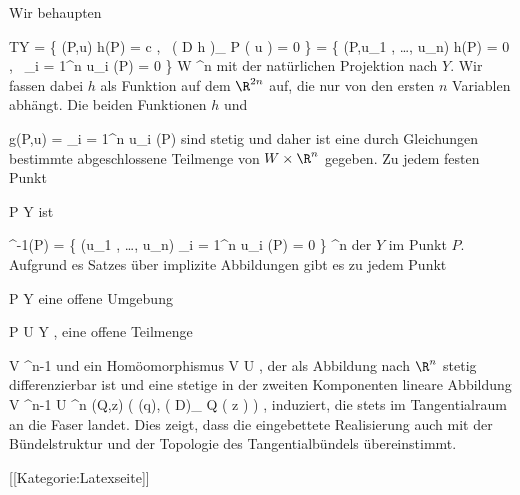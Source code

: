 Wir behaupten

\mavergleichskettealignhandlinks
{\vergleichskettealignhandlinks
{ TY
}
{ =} { \left\{  (P,u)   \mid   h(P) = c , \,  \left(  D h   \right)_{ P } \left(  u  \right) = 0       \right\}
}
{ =} { \left\{  (P,u_1 , \ldots , u_n)   \mid   h(P) = 0 , \,  \sum_{i = 1}^n u_i {  } (P) = 0       \right\}
}
{ \subseteq} { W \times \R^n
}
{ } {
}
}
{}
{}{}
mit der natürlichen Projektion nach $Y$. Wir fassen dabei $h$ als Funktion auf dem $\R^{2n}$ auf, die nur von den ersten $n$ Variablen abhängt. Die beiden Funktionen $h$  und

\mavergleichskettedisp
{\vergleichskette
{ g(P,u)
}
{ =} { \sum_{i = 1}^n u_i {  } (P)
}
{ } {
}
{ } {
}
{ } {
}
}
{}{}{}
sind stetig und daher ist eine durch Gleichungen bestimmte abgeschlossene Teilmenge von $W \times \R^n$ gegeben. Zu jedem festen Punkt

\mavergleichskette
{\vergleichskette
{ P
}
{ \in }{  Y
}
{  }{
}
{    }{
}
{   }{
}
}
{}{}{}
ist

\mavergleichskettedisp
{\vergleichskette
{  \pi^{-1}(P)
}
{ =} { \left\{  (u_1 , \ldots , u_n)   \mid   \sum_{i = 1}^n u_i {  } (P) = 0         \right\}
}
{ \subseteq} {  \R^n
}
{ } {
}
{ } {
}
}
{}{}{}
der
$Y$ im Punkt $P$. Aufgrund es Satzes über implizite Abbildungen gibt es zu jedem Punkt

\mavergleichskette
{\vergleichskette
{ P
}
{ \in }{  Y
}
{  }{
}
{    }{
}
{   }{
}
}
{}{}{}
eine offene Umgebung

\mavergleichskette
{\vergleichskette
{ P
}
{ \in }{  U
}
{ \subseteq }{ Y
}
{    }{
}
{   }{
}
}
{}{}{,}
eine offene Teilmenge

\mavergleichskette
{\vergleichskette
{ V
}
{ \subseteq }{  \R^{n-1}
}
{  }{
}
{    }{
}
{   }{
}
}
{}{}{}
und ein Homöomorphismus
\maabbdisp {\beta} { V } {U
} {,}
der als Abbildung nach $\R^n$ stetig differenzierbar ist und eine stetige in der zweiten Komponenten lineare Abbildung
\maabbeledisp {} {V \times \R^{n-1} } { U \times \R^n
} {(Q,z)} { ( \beta(q), \left(  D\beta  \right)_{ Q } \left(  z  \right) )
} {,}
induziert, die stets im Tangentialraum an die Faser landet. Dies zeigt, dass die eingebettete Realisierung auch mit der Bündelstruktur und der Topologie des Tangentialbündels übereinstimmt.

 [[Kategorie:Latexseite]]

